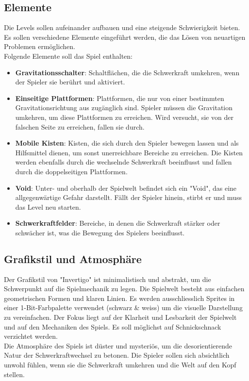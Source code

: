 \documentclass{article}
\begin{document}
\subsection{Elemente}

Die Levels sollen aufeinander aufbauen und eine steigende Schwierigkeit bieten.
Es sollen verschiedene Elemente eingeführt werden, die das Lösen von neuartigen Problemen ermöglichen.
\\
Folgende Elemente soll das Spiel enthalten:
\begin{itemize}
    \item \textbf{Gravitationsschalter}: Schaltflächen, die die Schwerkraft umkehren, wenn der Spieler sie berührt und aktiviert.
    \item \textbf{Einseitige Plattformen}: Plattformen, die nur von einer bestimmten Gravitationsrichtung aus zugänglich sind.
    Spieler müssen die Gravitation umkehren, um diese Plattformen zu erreichen. Wird versucht, sie von der falschen Seite zu erreichen, fallen sie durch.
    \item \textbf{Mobile Kisten}: Kisten, die sich durch den Spieler bewegen lassen und als Hilfsmittel dienen, um sonst unerreichbare Bereiche zu erreichen.
    Die Kisten werden ebenfalls durch die wechselnde Schwerkraft beeinflusst und fallen durch die doppelseitigen Plattformen.
    \item \textbf{Void}: Unter- und oberhalb der Spielwelt befindet sich ein "Void", das eine allgegenwärtige Gefahr darstellt. Fällt der Spieler hinein, stirbt er und muss das Level neu starten.
    \item \textbf{Schwerkraftfelder}: Bereiche, in denen die Schwerkraft stärker oder schwächer ist, was die Bewegung des Spielers beeinflusst.
\end{itemize}

\subsection{Grafikstil und Atmosphäre}

Der Grafikstil von "Invertigo" ist minimalistisch und abstrakt, um die Schwerpunkt auf die Spielmechanik zu legen. Die Spielwelt besteht aus einfachen geometrischen Formen und klaren Linien.
Es werden ausschliesslich Sprites in einer 1-Bit-Farbpalette verwendet (schwarz \& weiss) um die visuelle Darstellung zu vereinfachen.
Der Fokus liegt auf der Klarheit und Lesbarkeit der Spielwelt und auf den Mechaniken des Spiels. Es soll möglichst auf Schnickschnack verzichtet werden.
\\
Die Atmosphäre des Spiels ist düster und mysteriös, um die desorientierende Natur der Schwerkraftwechsel zu betonen.
Die Spieler sollen sich absichtlich unwohl fühlen, wenn sie die Schwerkraft umkehren und die Welt auf den Kopf stellen.
\end{document}
